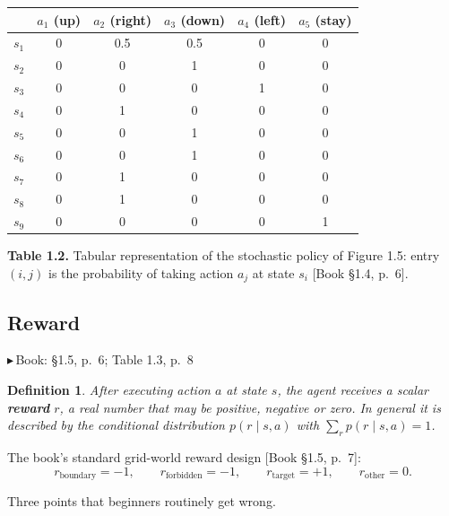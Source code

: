 \documentclass[11pt, letterpaper]{article}
\theoremstyle{runin}
\newtheorem*{definition}{Definition}
\theoremstyle{runinplain}
\theoremstyle{remark}
\newcommand{\bk}[1]{{\color{bookblue}\small$\blacktriangleright$\,\textsf{Book: #1}}}
\newcommand{\bkin}[1]{{\color{bookblue}\small[\textsf{Book #1}]}}
\begin{document}
\begin{table}[htbp]\centering\footnotesize
\begin{tabular}{@{}l|ccccc@{}}
\toprule
 & $a_1$ (up) & $a_2$ (right) & $a_3$ (down) & $a_4$ (left) & $a_5$ (stay)\\
\midrule
$s_1$ & 0 & 0.5 & 0.5 & 0 & 0\\
$s_2$ & 0 & 0 & 1 & 0 & 0\\
$s_3$ & 0 & 0 & 0 & 1 & 0\\
$s_4$ & 0 & 1 & 0 & 0 & 0\\
$s_5$ & 0 & 0 & 1 & 0 & 0\\
$s_6$ & 0 & 0 & 1 & 0 & 0\\
$s_7$ & 0 & 1 & 0 & 0 & 0\\
$s_8$ & 0 & 1 & 0 & 0 & 0\\
$s_9$ & 0 & 0 & 0 & 0 & 1\\
\bottomrule
\end{tabular}\par\smallskip
{\footnotesize\textbf{Table 1.2.} Tabular representation of the stochastic policy of Figure 1.5: entry
$(i,j)$ is the probability of taking action $a_j$ at state $s_i$ \bkin{\S1.4, p.~6}.}
\end{table}


\subsection{Reward}

\bk{\S1.5, p.~6; Table 1.3, p.~8}

\begin{definition}
After executing action $a$ at state $s$, the agent receives a scalar
\textbf{reward} $r$, a real number that may be positive, negative or zero. In
general it is described by the conditional distribution $p(r\mid s,a)$ with
$\sum_r p(r\mid s,a)=1$.
\end{definition}

The book's standard grid-world reward design \bkin{\S1.5, p.~7}:
\[
  r_{\text{boundary}}=-1,\qquad
  r_{\text{forbidden}}=-1,\qquad
  r_{\text{target}}=+1,\qquad
  r_{\text{other}}=0.
\]

Three points that beginners routinely get wrong.
\end{document}
